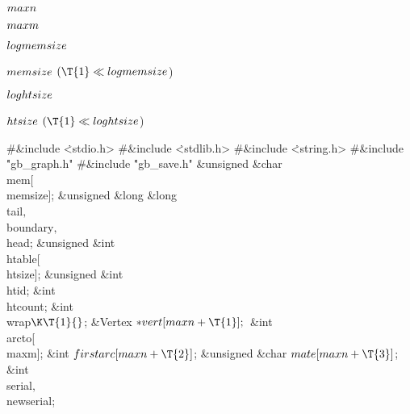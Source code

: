 \Y\B\4\D$\\{maxn}$ \5
\par
\B\4\D$\\{maxm}$ \5
\par
\B\4\D$\\{logmemsize}$ \5
\par
\B\4\D$\\{memsize}$ \5
$(\T{1}\LL\\{logmemsize}{}$)\par
\B\4\D$\\{loghtsize}$ \5
\par
\B\4\D$\\{htsize}$ \5
$(\T{1}\LL\\{loghtsize}{}$)\par
\Y\B\8\#\&{include} \.{<stdio.h>}\6
\8\#\&{include} \.{<stdlib.h>}\6
\8\#\&{include} \.{<string.h>}\6
\8\#\&{include} \.{"gb\_graph.h"}\6
\8\#\&{include} \.{"gb\_save.h"}\6
\&{unsigned} \&{char} \\{mem}[\\{memsize}];\6
\&{unsigned} \&{long} \&{long} \\{tail}${},{}$ \\{boundary}${},{}$ \\{head};\6
\&{unsigned} \&{int} \\{htable}[\\{htsize}];\6
\&{unsigned} \&{int} \\{htid};\6
\&{int} \\{htcount};\6
\&{int} \\{wrap}${}\K\T{1}{}$;\6
\&{Vertex} ${}{*}\\{vert}[\\{maxn}+\T{1}];{}$\6
\&{int} \\{arcto}[\\{maxm}];\6
\&{int} ${}\\{firstarc}[\\{maxn}+\T{2}]{}$;\6
\&{unsigned} \&{char} ${}\\{mate}[\\{maxn}+\T{3}]{}$;\6
\&{int} \\{serial}${},{}$ \\{newserial};\7
